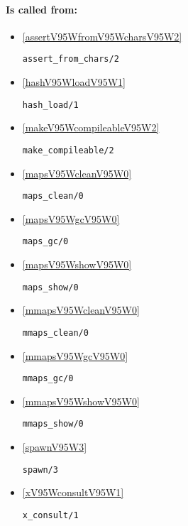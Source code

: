 \paragraph{Is called from:} 
\begin{itemize}
\item \ref{assertV95WfromV95WcharsV95W2} 
\begin{verbatim}
assert_from_chars/2
\end{verbatim}

\item \ref{hashV95WloadV95W1} 
\begin{verbatim}
hash_load/1
\end{verbatim}

\item \ref{makeV95WcompileableV95W2} 
\begin{verbatim}
make_compileable/2
\end{verbatim}

\item \ref{mapsV95WcleanV95W0} 
\begin{verbatim}
maps_clean/0
\end{verbatim}

\item \ref{mapsV95WgcV95W0} 
\begin{verbatim}
maps_gc/0
\end{verbatim}

\item \ref{mapsV95WshowV95W0} 
\begin{verbatim}
maps_show/0
\end{verbatim}

\item \ref{mmapsV95WcleanV95W0} 
\begin{verbatim}
mmaps_clean/0
\end{verbatim}

\item \ref{mmapsV95WgcV95W0} 
\begin{verbatim}
mmaps_gc/0
\end{verbatim}

\item \ref{mmapsV95WshowV95W0} 
\begin{verbatim}
mmaps_show/0
\end{verbatim}

\item \ref{spawnV95W3} 
\begin{verbatim}
spawn/3
\end{verbatim}

\item \ref{xV95WconsultV95W1} 
\begin{verbatim}
x_consult/1
\end{verbatim}

\end{itemize}


